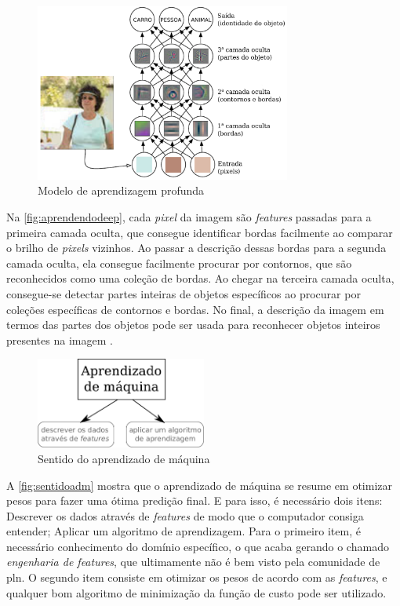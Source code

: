 \begin{figure}[!htb]
\centering
\caption{Modelo de aprendizagem profunda} \label{fig:aprendendodeep}
\includegraphics[width=0.75\textwidth]{img/aprendendodeep.pdf}
\end{figure}

Na \autoref{fig:aprendendodeep}, cada \textit{pixel} da imagem são \textit{features} passadas para a primeira camada oculta, que consegue identificar bordas facilmente ao comparar o brilho de \textit{pixels} vizinhos. Ao passar a descrição dessas bordas para a segunda camada oculta, ela consegue facilmente procurar por contornos, que são reconhecidos como uma coleção de bordas. Ao chegar na terceira camada oculta, consegue-se detectar partes inteiras de objetos específicos ao procurar por coleções específicas de contornos e bordas. No final, a descrição da imagem em termos das partes dos objetos pode ser usada para reconhecer objetos inteiros presentes na imagem \cite{Bengio-et-al-2015-Book}.


\begin{figure}[!htb]
\centering
\caption{Sentido do aprendizado de máquina} \label{fig:sentidoadm}
\includegraphics[width=0.5\textwidth]{img/sentidoadm}
\end{figure}

A \autoref{fig:sentidoadm} mostra que o aprendizado de máquina se resume em otimizar pesos para fazer uma ótima predição final. E para isso, é necessário dois itens: Descrever os dados através de \textit{features} de modo que o computador consiga entender; Aplicar um algoritmo de aprendizagem. Para o primeiro item, é necessário conhecimento do domínio específico, o que acaba gerando o chamado \textit{engenharia de features}, que ultimamente não é bem visto pela comunidade de \ac{pln}. O segundo item consiste em otimizar os pesos de acordo com as \textit{features}, e qualquer bom algoritmo de minimização da função de custo pode ser utilizado.


